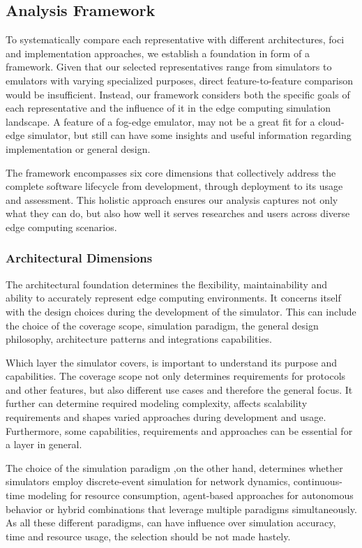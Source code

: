 \subsection{Analysis Framework}
To systematically compare each representative with different architectures, foci and implementation approaches, we establish a foundation in form of a framework.
Given that our selected representatives range from simulators to emulators with varying specialized purposes, direct feature-to-feature comparison would be insufficient.
Instead, our framework considers both the specific goals of each representative and the influence of it in the edge computing simulation landscape.
A feature of a fog-edge emulator, may not be a great fit for a cloud-edge simulator, but still can have some insights and useful information regarding implementation or general design.

The framework encompasses six core dimensions that collectively address the complete software lifecycle from development, through deployment to its usage and assessment.
This holistic approach ensures our analysis captures not only what they can do, but also how well it serves researches and users across diverse edge computing scenarios.

\subsubsection{Architectural Dimensions}
The architectural foundation determines the flexibility, maintainability and ability to accurately represent edge computing environments.
It concerns itself with the design choices during the development of the simulator.
This can include the choice of the coverage scope, simulation paradigm, the general design philosophy, architecture patterns and integrations capabilities.

Which layer the simulator covers, is important to understand its purpose and capabilities. 
The coverage scope not only determines requirements for protocols and other features, but also different use cases and therefore the general focus.
It further can determine required modeling complexity, affects scalability requirements and shapes varied approaches during development and usage.
Furthermore, some capabilities, requirements and approaches can be essential for a layer in general.

The choice of the simulation paradigm ,on the other hand, determines whether simulators employ discrete-event simulation for network dynamics, 
continuous-time modeling for resource consumption, agent-based approaches for autonomous behavior or hybrid combinations that leverage multiple paradigms simultaneously.
As all these different paradigms, can have influence over simulation accuracy, time and resource usage, the selection should be not made hastely.

